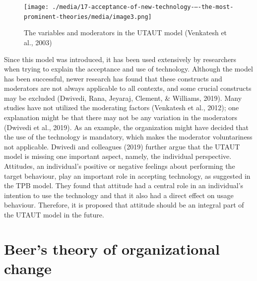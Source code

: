 \documentclass[
  12pt,
]{scrbook}
\begin{document}
\begin{figure}
\hypertarget{fig:figure163}{%
\centering
\texttt{[image: ./media/17-acceptance-of-new-technology-–-the-most-prominent-theories/media/image3.png]}
\caption[The variables and moderators in the UTAUT model (Venkatesh et al., 2003) ~]{The variables and moderators in the UTAUT model (Venkatesh et al., 2003)\footnotemark{} ~}\label{fig:figure163}
}
\end{figure}

Since this model was introduced, it has been used extensively by researchers when trying to explain the acceptance and use of technology. Although the model has been successful, newer research has found that these constructs and moderators are not always applicable to all contexts, and some crucial constructs may be excluded (Dwivedi, Rana, Jeyaraj, Clement, \& Williams, 2019). Many studies have not utilized the moderating factors (Venkatesh et al., 2012); one explanation might be that there may not be any variation in the moderators (Dwivedi et al., 2019). As an example, the organization might have decided that the use of the technology is mandatory, which makes the moderator voluntariness not applicable. Dwivedi and colleagues (2019) further argue that the UTAUT model is missing one important aspect, namely, the individual perspective. Attitudes, an individual's positive or negative feelings about performing the target behaviour, play an important role in accepting technology, as suggested in the TPB model. They found that attitude had a central role in an individual's intention to use the technology and that it also had a direct effect on usage behaviour. Therefore, it is proposed that attitude should be an integral part of the UTAUT model in the future.~

\hypertarget{beers-theory-of-organizational-change}{%
\section*{Beer's theory of organizational change~}\label{beers-theory-of-organizational-change}}
\end{document}

